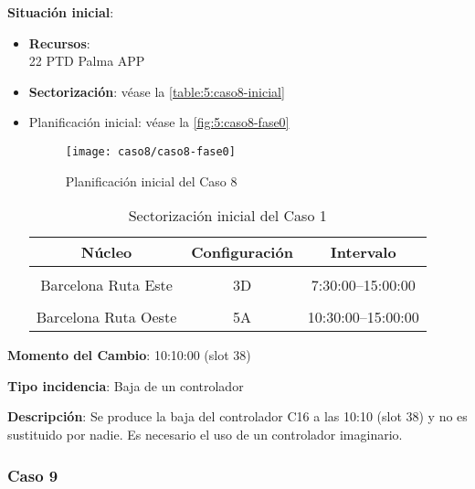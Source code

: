 \textbf{Situación inicial}:
\begin{itemize}[label={}]
	
	\item \textbf{Recursos}: \\
	22 PTD Palma APP \\
	
	
	\item \textbf{Sectorización}: véase la \autoref{table:5:caso8-inicial}
	
	\item Planificación inicial: véase la \autoref{fig:5:caso8-fase0}
	
	\begin{figure}[!h]
		\centering
		\texttt{[image: caso8/caso8-fase0]}
		\caption{Planificación inicial del Caso 8}
		\label{fig:5:caso8-fase0}
	\end{figure}

	\begin{table}[h]
		\centering
		\caption{Sectorización inicial del Caso 1}
		\begin{tabular}{ccc}
			\hline
			\textbf{Núcleo}      & \textbf{Configuración} & \textbf{Intervalo}   \\ \hline
			\multicolumn{1}{l}{} & \multicolumn{1}{l}{}   & \multicolumn{1}{l}{} \\
			Barcelona Ruta Este  & 3D                     & 7:30:00--15:00:00    \\
			\multicolumn{1}{l}{} & \multicolumn{1}{l}{}   & \multicolumn{1}{l}{} \\
			Barcelona Ruta Oeste & 5A                     & 10:30:00--15:00:00   \\ \hline
		\end{tabular}
		\label{table:5:caso8-inicial}
	\end{table}
	
\end{itemize}

\textbf{Momento del Cambio}: 10:10:00 (slot 38)

\textbf{Tipo incidencia}: Baja de un controlador

\textbf{Descripción}: Se produce la baja del controlador C16 a las 10:10 (slot 38) y no es sustituido por nadie. Es necesario el uso de un controlador imaginario.


\subsubsection{Caso 9}

